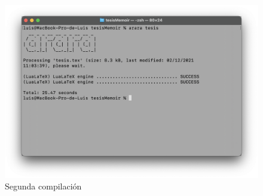 \begin{figure}
\centering
  \includegraphics[scale=0.3]{segunda}
  \caption{Segunda compilación}
\end{figure}

